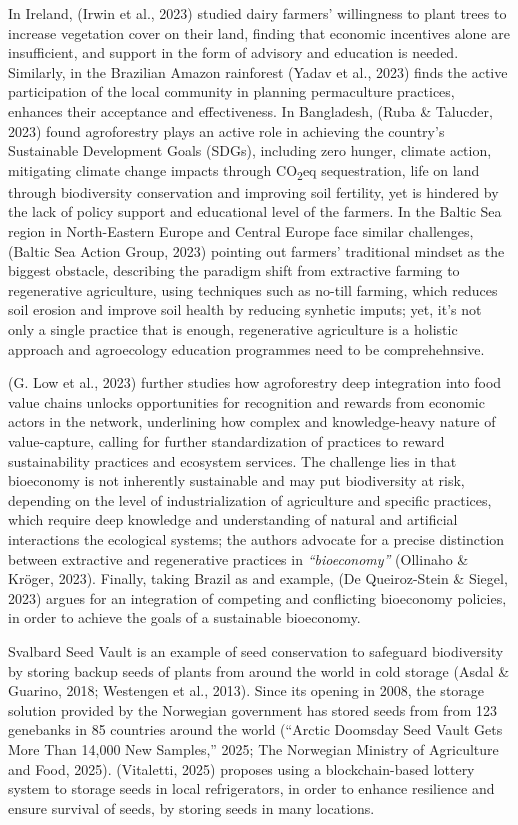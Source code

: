 \documentclass[
  12pt,
  letterpaper,
  DIV=11,
  numbers=noendperiod]{scrartcl}
\begin{document}
In Ireland, (Irwin et al., 2023) studied dairy farmers' willingness to
plant trees to increase vegetation cover on their land, finding that
economic incentives alone are insufficient, and support in the form of
advisory and education is needed. Similarly, in the Brazilian Amazon
rainforest (Yadav et al., 2023) finds the active participation of the
local community in planning permaculture practices, enhances their
acceptance and effectiveness. In Bangladesh, (Ruba \& Talucder, 2023)
found agroforestry plays an active role in achieving the country's
Sustainable Development Goals (SDGs), including zero hunger, climate
action, mitigating climate change impacts through CO\textsubscript{2}eq
sequestration, life on land through biodiversity conservation and
improving soil fertility, yet is hindered by the lack of policy support
and educational level of the farmers. In the Baltic Sea region in
North-Eastern Europe and Central Europe face similar challenges, (Baltic
Sea Action Group, 2023) pointing out farmers' traditional mindset as the
biggest obstacle, describing the paradigm shift from extractive farming
to regenerative agriculture, using techniques such as no-till farming,
which reduces soil erosion and improve soil health by reducing synhetic
imputs; yet, it's not only a single practice that is enough,
regenerative agriculture is a holistic approach and agroecology
education programmes need to be comprehehnsive.

(G. Low et al., 2023) further studies how agroforestry deep integration
into food value chains unlocks opportunities for recognition and rewards
from economic actors in the network, underlining how complex and
knowledge-heavy nature of value-capture, calling for further
standardization of practices to reward sustainability practices and
ecosystem services. The challenge lies in that bioeconomy is not
inherently sustainable and may put biodiversity at risk, depending on
the level of industrialization of agriculture and specific practices,
which require deep knowledge and understanding of natural and artificial
interactions the ecological systems; the authors advocate for a precise
distinction between extractive and regenerative practices in
\emph{``bioeconomy''} (Ollinaho \& Kröger, 2023). Finally, taking Brazil
as and example, (De Queiroz-Stein \& Siegel, 2023) argues for an
integration of competing and conflicting bioeconomy policies, in order
to achieve the goals of a sustainable bioeconomy.

Svalbard Seed Vault is an example of seed conservation to safeguard
biodiversity by storing backup seeds of plants from around the world in
cold storage (Asdal \& Guarino, 2018; Westengen et al., 2013). Since its
opening in 2008, the storage solution provided by the Norwegian
government has stored seeds from from 123 genebanks in 85 countries
around the world ({``Arctic Doomsday Seed Vault Gets More Than 14,000
New Samples,''} 2025; The Norwegian Ministry of Agriculture and Food,
2025). (Vitaletti, 2025) proposes using a blockchain-based lottery
system to storage seeds in local refrigerators, in order to enhance
resilience and ensure survival of seeds, by storing seeds in many
locations.
\end{document}
